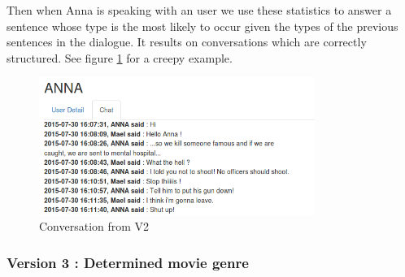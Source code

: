 Then when Anna is speaking with an user we use these statistics to answer a sentence whose type is the most likely to occur given the types of the previous sentences in the dialogue. It results on conversations which are correctly structured. See figure \ref{fig:convST} for a creepy example.
\begin{figure}[!h]
\begin{center}
\includegraphics[width=0.80\textwidth]{./img/convST.png}
\end{center}
\caption{Conversation from V2}
\label{fig:convST}
\end{figure}
\subsubsection{Version 3 : Determined movie genre}
\label{sssec:v_genre}

